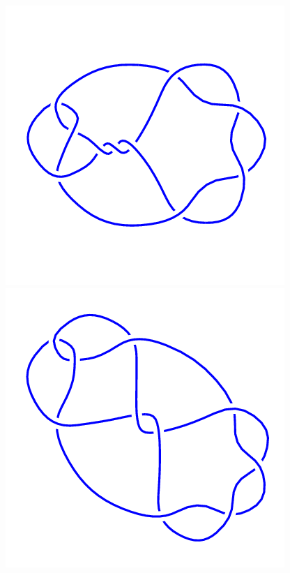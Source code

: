 \begin{figure}[H]
	\begin{minipage}[b]{.18\linewidth}
		\centering
		\includegraphics[width=\linewidth]{../data/10_12.png}
	\end{minipage}
	\begin{minipage}[b]{.18\linewidth}
		\centering
		\includegraphics[width=\linewidth]{../data/10_13.png}

\end{minipage}
\end{figure}
